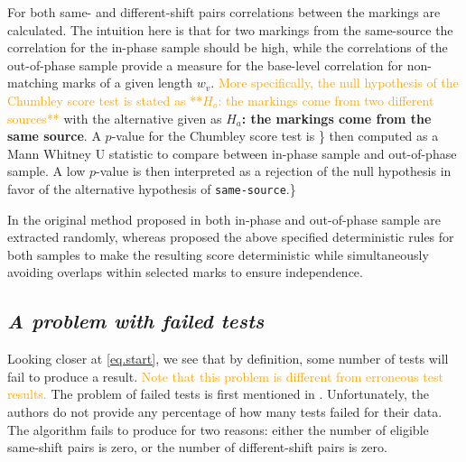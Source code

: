 \documentclass[12pt]{article}
\begin{document}
For both same- and different-shift pairs correlations between the
markings are calculated. The intuition here is that for two markings
from the same-source the correlation for the in-phase sample should be
high, while the correlations of the out-of-phase sample provide a
measure for the base-level correlation for non-matching marks of a given
length \(w_v\).
{\textcolor{orange}{More specifically, the null hypothesis of the Chumbley score test is stated as **$H_o$: the markings come from two different sources**}}
with the alternative given as \textbf{\(H_a\): the markings come from
the same source}. A \(p\)-value for the Chumbley score test is \} then
computed as a Mann Whitney U statistic to compare between in-phase
sample and out-of-phase sample. A low \(p\)-value is then interpreted as
a rejection of the null hypothesis in favor of the alternative
hypothesis of \texttt{same-source}.\}

In the original method proposed in \citet{chumbley} both in-phase and
out-of-phase sample are extracted randomly, whereas \citet{hadler}
proposed the above specified deterministic rules for both samples to
make the resulting score deterministic while simultaneously avoiding
overlaps within selected marks to ensure independence.

\hypertarget{a-problem-with-failed-tests}{%
\subsection*{\texorpdfstring{\emph{A problem with failed
tests}}{A problem with failed tests}}\label{a-problem-with-failed-tests}}

Looking closer at \autoref{eq.start}, we see that by definition, some
number of tests will fail to produce a result.
{\textcolor{orange}{Note that this problem is different from erroneous test results.}}
The problem of failed tests is first mentioned in \citet{afte-chumbley}.
Unfortunately, the authors do not provide any percentage of how many
tests failed for their data. The algorithm fails to produce for two
reasons: either the number of eligible same-shift pairs is zero, or the
number of different-shift pairs is zero.
\end{document}
